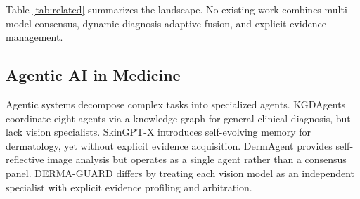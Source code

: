\documentclass[conference]{IEEEtran}
\begin{document}
Table \ref{tab:related} summarizes the landscape. No existing work combines multi-model consensus, dynamic diagnosis-adaptive fusion, and explicit evidence management.

\begin{table}[t]
\caption{Comparison of multimodal dermatology AI systems. \checkmark = fully addressed, $\sim$ = partially addressed, $\times$ = not addressed.}
\label{tab:related}
\centering
{}
\end{table}

\subsection{Agentic AI in Medicine}

Agentic systems decompose complex tasks into specialized agents. KGDAgents \cite{kgdagents2026} coordinate eight agents via a knowledge graph for general clinical diagnosis, but lack vision specialists. SkinGPT-X \cite{skingptx2026} introduces self-evolving memory for dermatology, yet without explicit evidence acquisition. DermAgent \cite{dermagent2026} provides self-reflective image analysis but operates as a single agent rather than a consensus panel. DERMA-GUARD differs by treating each vision model as an independent specialist with explicit evidence profiling and arbitration.
\end{document}
